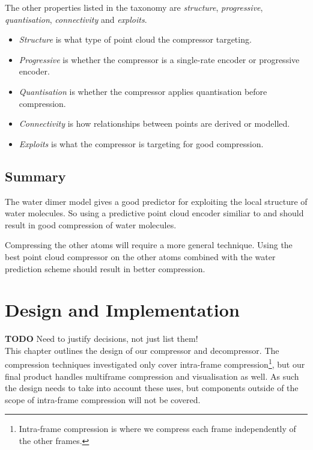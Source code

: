 \documentclass{report}
\newcommand{\todo}{\textbf{TODO} }
\begin{document}
The other properties listed in the taxonomy are \emph{structure},
\emph{progressive}, \emph{quantisation}, \emph{connectivity} and
\emph{exploits}.

\begin{itemize}
\item \emph{Structure} is what type of point cloud the compressor targeting.

\item \emph{Progressive} is whether the compressor is a single-rate encoder or
  progressive encoder.

\item \emph{Quantisation} is whether the compressor applies quantisation
  before compression.

\item \emph{Connectivity} is how relationships between points are derived or
  modelled.

\item \emph{Exploits} is what the compressor is targeting for good
  compression.
\end{itemize}


\section{Summary}

The water dimer model gives a good predictor for exploiting the local
structure of water molecules. So using a predictive point cloud encoder
similiar to \citep{merrycomp} and \citep{gumholdcomp} should result in good
compression of water molecules.

Compressing the other atoms will require a more general technique. Using the
best point cloud compressor on the other atoms combined with the water
prediction scheme should result in better compression.


\chapter{Design and Implementation}

\todo Need to justify decisions, not just list them! \\

This chapter outlines the design of our compressor and decompressor. The
compression techniques investigated only cover intra-frame
compression\footnote{Intra-frame compression is where we compress each frame
  independently of the other frames.}, but our final product handles
multiframe compression and visualisation as well. As such the design needs to
take into account these uses, but components outside of the scope of
intra-frame compression will not be covered.
\end{document}
